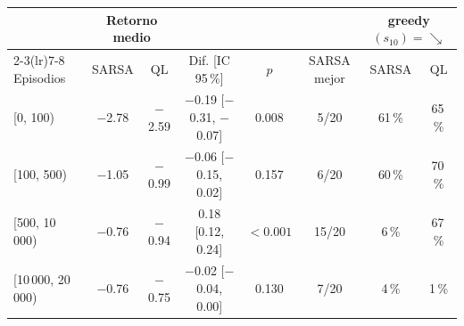 \begin{tabular}{lccccccc}
\toprule
 & \multicolumn{2}{c}{Retorno medio} & & & & \multicolumn{2}{c}{greedy$(s_{10})=\searrow$} \\
\cmidrule(lr){2-3}\cmidrule(lr){7-8}
Episodios & SARSA & QL & Dif. [IC 95\,\%] & $p$ & SARSA mejor & SARSA & QL \\
\midrule
{}[0, 100) & $-$2.78 & $-$2.59 & $-$0.19 [$-$0.31, $-$0.07] & 0.008 & 5/20 & 61\,\% & 65\,\% \\
{}[100, 500) & $-$1.05 & $-$0.99 & $-$0.06 [$-$0.15, 0.02] & 0.157 & 6/20 & 60\,\% & 70\,\% \\
{}[500, 10\,000) & $-$0.76 & $-$0.94 & 0.18 [0.12, 0.24] & $<0.001$ & 15/20 & 6\,\% & 67\,\% \\
{}[10\,000, 20\,000) & $-$0.76 & $-$0.75 & $-$0.02 [$-$0.04, 0.00] & 0.130 & 7/20 & 4\,\% & 1\,\% \\
\bottomrule
\end{tabular}
